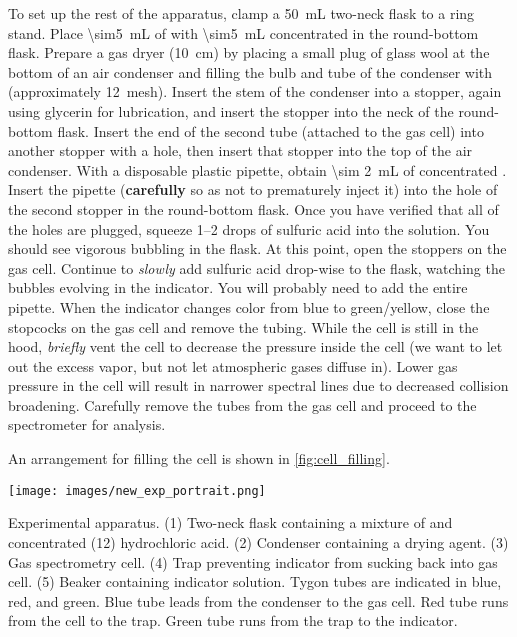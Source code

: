 To set up the rest of the apparatus, clamp a \qty{50}{\mL} two-neck flask to a ring stand. 
Place \qty{\sim5}{\mL} of  with \qty{\sim5}{\mL} concentrated  in the round-bottom flask.
Prepare a gas dryer (\qty{10}{\cm}) by placing a small plug of glass wool at the bottom of an air condenser and filling the bulb and tube of the condenser with  (approximately \qty{12}{mesh}). 
Insert the stem of the condenser into a stopper, again using glycerin for lubrication, and insert the stopper into the neck of the round-bottom flask. 
Insert the end of the second tube (attached to the gas cell) into another stopper with a hole, then insert that stopper into the top of the air condenser. 
With a disposable plastic pipette, obtain \qty{\sim 2}{\mL} of concentrated .
Insert the pipette (\textbf{carefully} so as not to prematurely inject it) into the hole of the second stopper in the round-bottom flask.
Once you have verified that all of the holes are plugged, squeeze \numrange{1}{2} drops of sulfuric acid into the solution.
You should see vigorous bubbling in the flask.
At this point, open the stoppers on the gas cell.
Continue to \emph{slowly} add sulfuric acid drop-wise to the flask, watching the bubbles evolving in the indicator. 
You will probably need to add the entire pipette. 
When the indicator changes color from blue to green/yellow, close the stopcocks on the gas cell and remove the tubing. 
While the cell is still in the hood, \emph{briefly} vent the cell to decrease the pressure inside the cell (we want to let out the excess  vapor, but not let atmospheric gases diffuse in). 
Lower gas pressure in the cell will result in narrower spectral lines due to decreased collision broadening. 
Carefully remove the tubes from the gas cell and proceed to the spectrometer for analysis. 

An arrangement for filling the cell is shown in \cref{fig:cell_filling}.

\begin{marginfigure}%
  \centering
	\texttt{[image: images/new\_exp\_portrait.png]}
  \caption{Experimental apparatus. (1) Two-neck flask containing a mixture of  and concentrated (\qty{12}{\molar}) hydrochloric acid. (2) Condenser containing a drying agent. (3) Gas spectrometry cell. (4) Trap preventing indicator from sucking back into gas cell. (5) Beaker containing indicator solution. Tygon tubes are indicated in blue, red, and green. Blue tube leads from the condenser to the gas cell. Red tube runs from the cell to the trap. Green tube runs from the trap to the indicator.}
  \label{fig:cell_filling}
\end{marginfigure}

